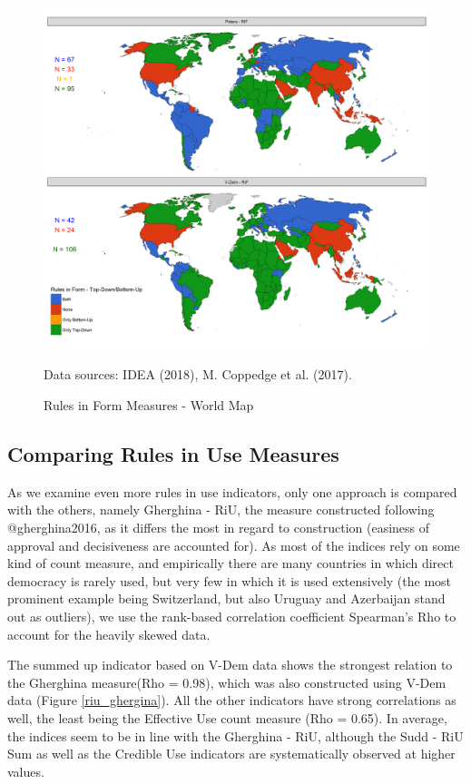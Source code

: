 \documentclass[]{article}
\begin{document}
\begin{figure}[!h]
\caption{Rules in Form Measures - World Map}
\label{map_rif}
\includegraphics[width=\textwidth]{images/map_rif.png}
\flushright
    {\scriptsize Data sources: IDEA (2018), M. Coppedge et al. (2017).\par}
\end{figure}

\subsection{Comparing Rules in Use Measures} \label{riu_empiric}

As we examine even more rules in use indicators, only one approach is
compared with the others, namely Gherghina - RiU, the measure
constructed following @gherghina2016, as it differs the most in regard
to construction (easiness of approval and decisiveness are accounted
for). As most of the indices rely on some kind of count measure, and
empirically there are many countries in which direct democracy is rarely
used, but very few in which it is used extensively (the most prominent
example being Switzerland, but also Uruguay and Azerbaijan stand out as
outliers), we use the rank-based correlation coefficient Spearman's Rho
to account for the heavily skewed data.

The summed up indicator based on V-Dem data shows the strongest relation
to the Gherghina measure(Rho = 0.98), which was also constructed using
V-Dem data (Figure \ref{riu_ghergina}). All the other indicators have
strong correlations as well, the least being the Effective Use count
measure (Rho = 0.65). In average, the indices seem to be in line with
the Gherghina - RiU, although the Sudd - RiU Sum as well as the Credible
Use indicators are systematically observed at higher values.
\end{document}
